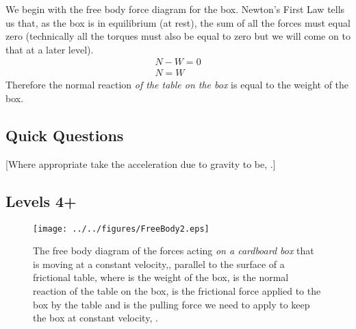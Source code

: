 \noindent We begin with the free body force diagram for the box.  Newton's First Law tells us that, as the box is in equilibrium (at rest), the sum of all the forces must equal zero (technically all the torques must also be equal to zero but we will come on to that at a later level).
\begin{eqnarray}
N-W=0 \\
N=W
\end{eqnarray}
Therefore the normal reaction \emph{of the table on the box} is equal to the weight of the box.

\subsection*{Quick Questions}
[Where appropriate take the acceleration due to gravity to be, .]\nll
{}\nl
{}\nl
{}


\subsection*{Levels 4+}
\setlength{\columnsep}{22pt}
\begin{wrapfigure}{r}{6cm} \vspace{-2.0cm}
\center
\texttt{[image: ../../figures/FreeBody2.eps]}
\caption{The free body diagram of the forces acting \emph{on a cardboard box} that is moving at a constant velocity,, parallel to the surface of a frictional table, where  is the weight of the box,  is the normal reaction of the table on the box,  is the frictional force applied to the box by the table and  is the pulling force we need to apply to keep the box at constant velocity, . } \label{NI2}
\end{wrapfigure}

